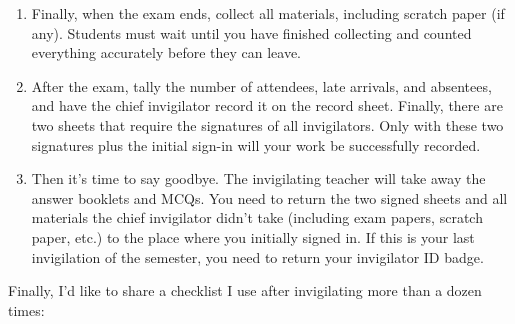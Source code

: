 \begin{enumerate}
    \item Finally, when the exam ends, collect all materials, including scratch paper (if any). Students must wait until you have finished collecting and counted everything accurately before they can leave.
    \item After the exam, tally the number of attendees, late arrivals, and absentees, and have the chief invigilator record it on the record sheet. Finally, there are two sheets that require the signatures of all invigilators. Only with these two signatures plus the initial sign-in will your work be successfully recorded.
    \item Then it's time to say goodbye. The invigilating teacher will take away the answer booklets and MCQs. You need to return the two signed sheets and all materials the chief invigilator didn't take (including exam papers, scratch paper, etc.) to the place where you initially signed in. If this is your last invigilation of the semester, you need to return your invigilator ID badge.
\end{enumerate}

\emptyline{}
Finally, I'd like to share a checklist I use after invigilating more than a dozen times:

